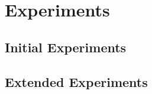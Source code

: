 \chapter{Experiments}\label{ch:experiments}

\Blindtext


\section{Initial Experiments}

\Blindtext


\section{Extended Experiments}

\Blindtext

